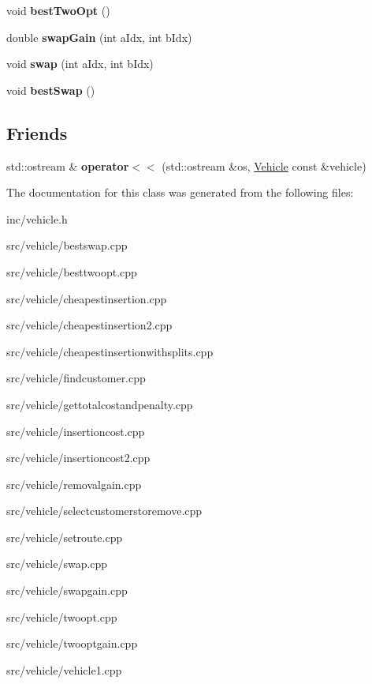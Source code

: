 \begin{DoxyCompactItemize}
void {\bfseries best\+Two\+Opt} ()
\item 
\mbox{\label{class_vehicle_a738c59dd2399d2bc1198db5e44be3db9}} 
double {\bfseries swap\+Gain} (int a\+Idx, int b\+Idx)
\item 
\mbox{\label{class_vehicle_a5ba7b2efd185ad5b567146c5249a3465}} 
void {\bfseries swap} (int a\+Idx, int b\+Idx)
\item 
\mbox{\label{class_vehicle_ae3da9e9bc42637d5f8d2beac2cf93ef3}} 
void {\bfseries best\+Swap} ()
\end{DoxyCompactItemize}
\subsection*{Friends}
\begin{DoxyCompactItemize}
\item 
\mbox{\label{class_vehicle_a03fb689e9f7599db1bb3e86d7b587998}} 
std\+::ostream \& {\bfseries operator$<$$<$} (std\+::ostream \&os, \hyperlink{class_vehicle}{Vehicle} const \&vehicle)
\end{DoxyCompactItemize}


The documentation for this class was generated from the following files\+:\begin{DoxyCompactItemize}
\item 
inc/vehicle.\+h\item 
src/vehicle/bestswap.\+cpp\item 
src/vehicle/besttwoopt.\+cpp\item 
src/vehicle/cheapestinsertion.\+cpp\item 
src/vehicle/cheapestinsertion2.\+cpp\item 
src/vehicle/cheapestinsertionwithsplits.\+cpp\item 
src/vehicle/findcustomer.\+cpp\item 
src/vehicle/gettotalcostandpenalty.\+cpp\item 
src/vehicle/insertioncost.\+cpp\item 
src/vehicle/insertioncost2.\+cpp\item 
src/vehicle/removalgain.\+cpp\item 
src/vehicle/selectcustomerstoremove.\+cpp\item 
src/vehicle/setroute.\+cpp\item 
src/vehicle/swap.\+cpp\item 
src/vehicle/swapgain.\+cpp\item 
src/vehicle/twoopt.\+cpp\item 
src/vehicle/twooptgain.\+cpp\item 
src/vehicle/vehicle1.\+cpp\end{DoxyCompactItemize}
